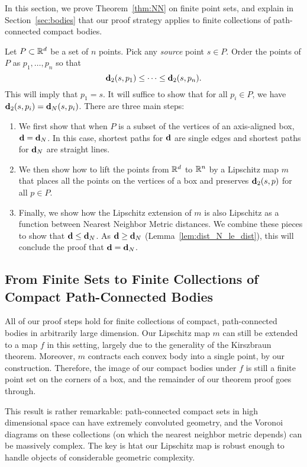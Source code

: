 In this section, we prove Theorem~\ref{thm:NN} on finite point sets, and
explain in Section~\ref{sec:bodies} that our proof strategy applies to
finite collections of path-connected compact bodies.
\label{sec:the_proof}

  Let $P\subset \mathbb{R}^d$ be a set of $n$ points.
  Pick any \emph{source} point $s\in P$.
  Order the points of $P$ as $p_1,\ldots ,p_n$ so that
  \[
    \mathbf{d}_2(s,p_1) \le \cdots \le \mathbf{d}_2(s, p_n).
  \]
  This will imply that $p_1 = s$.
  It will suffice to show that for all $p_i\in P$, we have $\mathbf{d}_2(s,p_i) = \mathbf{d}_N(s,p_i)$.
  There are three main steps:
  \begin{enumerate}
    \item We first show that when $P$ is a subset of the vertices of an axis-aligned box, $\mathbf{d} = \mathbf{d}_N$.  In this case, shortest paths for $\mathbf{d}$ are single edges and shortest paths for $\mathbf{d}_N$ are straight lines.
    \item We then show how to lift the points from $\mathbb{R}^d$ to $\mathbb{R}^n$ by a Lipschitz map $m$ that places all the points on the vertices of a box and preserves $\mathbf{d}_2(s,p)$ for all $p\in P$.
    \item Finally, we show how the Lipschitz extension of $m$ is also Lipschitz as a function between Nearest Neighbor Metric distances.  We combine these pieces to show that $\mathbf{d} \le \mathbf{d}_N$.  As $\mathbf{d} \ge \mathbf{d}_N$ (Lemma~\ref{lem:dist_N_le_dist}), this will conclude the proof that $\mathbf{d} = \mathbf{d}_N$.
  \end{enumerate}
  
  
  
\subsection{From Finite Sets to Finite Collections of Compact Path-Connected Bodies}
All of our proof steps hold for finite collections of compact,
path-connected bodies in arbitrarily large dimension. Our Lipschitz map $m$ can
still be extended to a map $f$ in this setting, largely due to the
generality of the Kirszbraun theorem. Moreover, $m$ contracts each convex
body into a single point, by our construction. Therefore, the image of our
compact bodies under $f$ is still a finite point set on the corners of a
box, and the remainder of our theorem proof goes through.

This result is rather remarkable: path-connected compact sets in high
dimensional space can have extremely convoluted geometry, and the Voronoi diagrams
on these collections (on which the nearest neighbor metric depends) can be
massively complex.  The key is htat our Lipschitz map is robust enough to
handle objects of considerable geometric complexity.
  
  
